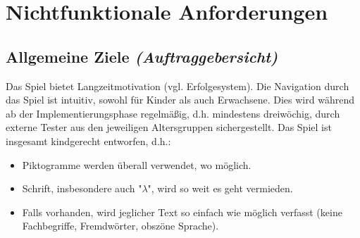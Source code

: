 \section{Nichtfunktionale Anforderungen}

\subsection{Allgemeine Ziele \textit{(Auftraggebersicht)}}
\begin{requirements}
	 Das Spiel bietet Langzeitmotivation (vgl. Erfolgesystem).
	 Die Navigation durch das Spiel ist intuitiv, sowohl für Kinder als auch Erwachsene. Dies wird während ab der Implementierungsphase regelmäßig, d.h. mindestens dreiwöchig, durch externe Tester aus den jeweiligen Altersgruppen sichergestellt.
	 Das Spiel ist insgesamt kindgerecht entworfen, d.h.:
		\begin{itemize}
			\item Piktogramme werden überall verwendet, wo möglich.
			\item Schrift, insbesondere auch "$\lambda$", wird so weit es geht vermieden.
			\item Falls vorhanden, wird jeglicher Text so einfach wie möglich verfasst (keine Fachbegriffe, Fremdwörter, obszöne Sprache).
		\end{itemize}
\end{requirements}


